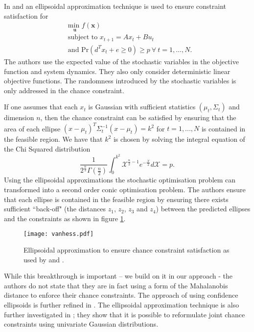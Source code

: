 In \cite{vanhessem2} and \cite{vanhessem1} an ellipsoidal approximation technique is used to ensure constraint satisfaction for  
\begin{equation}
\begin{aligned}
&\underset{\mathbf{u}}{\text{min }} f(\mathbf{x}) \\
& \text{subject to } x_{t+1}=Ax_t+Bu_t \\
& \text{and } \text{Pr}(d^Tx_t + e \geq 0) \geq p ~\forall ~t=1,\hdots,N.
\end{aligned}
\label{eq_lit_chance_mpc_vanhessem}
\end{equation}
The authors use the expected value of the stochastic variables in the objective function and system dynamics. They also only consider deterministic linear objective functions. The randomness introduced by the stochastic variables is only addressed in the chance constraint.

If one assumes that each $x_t$ is Gaussian with sufficient statistics $(\mu_t, \Sigma_t)$ and dimension $n$, then the chance constraint can be satisfied by ensuring that the area of each ellipse $(x-\mu_t)^T\Sigma_t^{-1}(x-\mu_t)=k^2$ for $t=1,...,N$ is contained in the feasible region. We have that $k^2$ is chosen by solving the integral equation of the Chi Squared distribution
\begin{equation}
\frac{1}{2^{\frac{n}{2}}\Gamma(\frac{n}{2})}\int_0^{k^2}\mathcal{X}^{\frac{n}{2}-1}e^{-\frac{\mathcal{X}}{2}}d\mathcal{X} = p.
\label{eq_lit_chi_squared}
\end{equation} 
Using the ellipsoidal approximations the stochastic optimisation problem can transformed into a second order conic optimisation problem. The authors ensure that each ellipse is contained in the feasible region by ensuring there exists sufficient ``back-off" (the distances $z_1$, $z_2$, $z_3$ and $z_4$) between the predicted ellipses and the constraints as shown in figure \ref{fig_vanhessem}.
\begin{figure}[H]
\centering
\texttt{[image: vanhess.pdf]}
\caption{Ellipsoidal approximation to ensure chance constraint satisfaction as used by \cite{vanhessem2} and \cite{vanhessem1}.}
\label{fig_vanhessem}
\end{figure}
While this breakthrough is important -- we build on it in our approach - the authors do not state that they are in fact using a form of the Mahalanobis distance to enforce their chance constraints. The approach of using confidence ellipsoids is further refined in \cite{cannon}. The ellipsoidal approximation technique is also further investigated in \cite{blackmore2}; they show that it is possible to reformulate joint chance constraints using univariate Gaussian distributions. 

